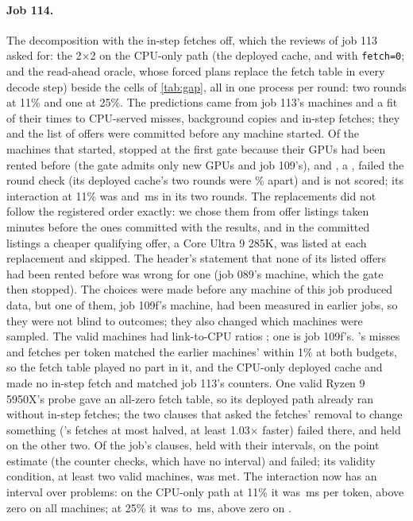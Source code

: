 \paragraph{Job 114.} The decomposition with the in-step fetches off, which the reviews of job 113 asked for: the
2$\times$2 on the CPU-only path (the deployed cache, \DepOne{} and \MinTwo{} with \texttt{fetch=0}; \MinOne{} and the
read-ahead oracle, whose forced plans replace the fetch table in every decode step) beside the cells of \cref{tab:gap},
all in one process per round: two rounds at 11\% and one at 25\%. The predictions came from job 113's machines and a
fit of their times to CPU-served misses, background copies and in-step fetches; they and the list of offers were
committed before any machine started. Of the \dzStarted{} machines that started, \dzGated{} stopped at the first gate
because their GPUs had been rented before (the gate admits only new GPUs and job 109's), and \dzRoundFailN, a
\dzRoundFailCpu, failed the round check (its deployed cache's two rounds were \dzRoundFailSpread\% apart) and is not
scored; its interaction at 11\% was \dzRoundFailInterMin{} and \dzRoundFailInterMax\,ms in its two rounds. The replacements did not follow the registered order exactly: we chose them from offer listings taken minutes
before the ones committed with the results, and in the committed listings a cheaper qualifying offer, a Core Ultra 9
285K, was listed at each replacement and skipped. The header's statement that none of its listed offers had been rented
before was wrong for one (job 089's machine, which the gate then stopped). The choices were made before any machine of
this job produced data, but one of them, job 109f's machine, had been measured in earlier jobs, so they were not blind
to outcomes; they also changed which machines were sampled.
The \dzNWord{} valid machines had link-to-CPU ratios \dzRatioRng; one is job 109f's. \MinOne's misses and fetches per
token matched the earlier machines' within 1\% at both budgets, so the fetch table played no part in it, and the
CPU-only deployed cache and \MinTwo{} made no in-step fetch and matched job 113's counters. One valid Ryzen 9 5950X's
probe gave an all-zero fetch table, so its deployed path already ran without in-step fetches; the two clauses that
asked the fetches' removal to change something (\DepOne's fetches at most halved, \MinTwo{} at least 1.03$\times$ faster)
failed there, and held on the other two. Of the job's \dzClauses{} clauses, \dzClausesHeld{} held with their intervals,
\dzClausesPoint{} on the point estimate (the counter checks, which have no interval) and \dzClausesFailed{} failed; its
validity condition, at least two valid machines, was met. The
interaction now has an interval over problems: on the CPU-only path at 11\% it was \dzInterMsLowRng\,ms per token,
above zero on all \dzN{} machines; at 25\% it was \dzInterMsMidMin{} to \dzInterMsMidMax\,ms, above zero on \dzInterPosCIMid.

